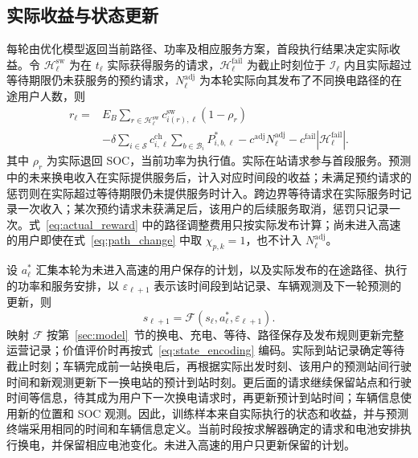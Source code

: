 \subsection{实际收益与状态更新}
\label{sec:reward}
每轮由优化模型返回当前路径、功率及相应服务方案，首段执行结果决定实际收益。令 $\mathcal H_\ell^{\mathrm{sw}}$ 为在 $t_\ell$ 实际获得服务的请求，$\mathcal H_\ell^{\mathrm{fail}}$ 为截止时刻位于 $\mathcal I_\ell$ 内且实际超过等待期限仍未获服务的预约请求，$N_\ell^{\mathrm{adj}}$ 为本轮实际向其发布了不同换电路径的在途用户人数，则
\begin{equation}
\begin{aligned}
r_\ell={}&E_B\sum_{r\in\mathcal H_\ell^{\mathrm{sw}}}
c_{i(r),\ell}^{\mathrm{sw}}(1-\rho_r)\\
&-\delta\sum_{i\in\mathcal S}c_{i,\ell}^{\mathrm{ch}}
\sum_{b\in\mathcal B_i}P_{i,b,\ell}^{*}
-c^{\mathrm{adj}}N_\ell^{\mathrm{adj}}
-c^{\mathrm{fail}}|\mathcal H_\ell^{\mathrm{fail}}|.
\end{aligned}
\label{eq:actual_reward}
\end{equation}
其中 $\rho_r$ 为实际退回 SOC，当前功率为执行值。实际在站请求参与首段服务。预测中的未来换电收入在实际提供服务后，计入对应时间段的收益；未满足预约请求的惩罚则在实际超过等待期限仍未提供服务时计入。跨边界等待请求在实际服务时记录一次收入；某次预约请求未获满足后，该用户的后续服务取消，惩罚只记录一次。式~\eqref{eq:actual_reward} 中的路径调整费用只按实际发布计算；尚未进入高速的用户即使在式~\eqref{eq:path_change} 中取 $\chi_{p,k}=1$，也不计入 $N_\ell^{\mathrm{adj}}$。

设 $a_\ell^*$ 汇集本轮为未进入高速的用户保存的计划，以及实际发布的在途路径、执行的功率和服务安排，以 $\varepsilon_{\ell+1}$ 表示该时间段到站记录、车辆观测及下一轮预测的更新，则
\begin{equation}
s_{\ell+1}=\mathcal F(s_\ell,a_\ell^*,\varepsilon_{\ell+1}).
\label{eq:state_transition}
\end{equation}
映射 $\mathcal F$ 按第~\ref{sec:model}~节的换电、充电、等待、路径保存及发布规则更新完整运营记录；价值评价时再按式~\eqref{eq:state_encoding} 编码。实际到站记录确定等待截止时刻；车辆完成前一站换电后，再根据实际出发时刻、该用户的预测站间行驶时间和新观测更新下一换电站的预计到站时刻。更后面的请求继续保留站点和行驶时间等信息，待其成为用户下一次换电请求时，再更新预计到站时间；车辆信息使用新的位置和 SOC 观测。因此，训练样本来自实际执行的状态和收益，并与预测终端采用相同的时间和车辆信息定义。当前时段按求解器确定的请求和电池安排执行换电，并保留相应电池变化。未进入高速的用户只更新保留的计划。

